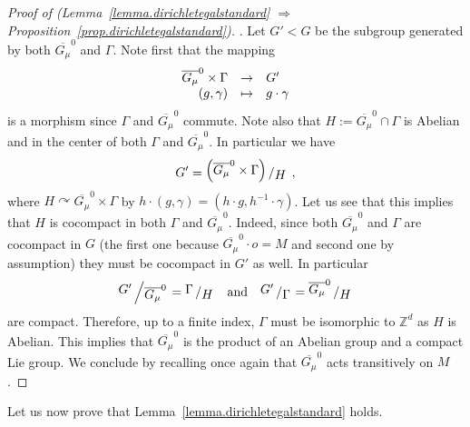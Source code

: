 \documentclass[AHL,Unicode,longabstracts,published]{cedram}
\newcommand{\ZZ}{\mathbb{Z}}
\newcommand{\quotient}[2]{{\raisebox{.2em}{$#1$}\left/\raisebox{-.2em}{$#2$}\right.}}
\newcommand{\fonctionbis}[4]{
\begin{array}{r c l}
#1 & \to & #2 \\
#3 & \mapsto & #4 \\
\end{array}}
\begin{document}
\begin{proof}[Proof of (Lemma~\ref{lemma.dirichletegalstandard} $\Rightarrow$ \emph{Proposition}~\ref{prop.dirichletegalstandard})]. Let $G' < G$ be the subgroup generated by both $\overline{G_{\mu}}^0$ and $\Gamma$. Note first that the mapping
\[
\fonctionbis{\overline{G_{\mu}}^0 \times \Gamma}{G'}{(g, \gamma)}{ g\cdot \gamma }
\]
is a morphism since $\Gamma$ and $\overline{G_{\mu}}^0$ commute. Note also that $H := \overline{G_{\mu}}^0 \cap \Gamma$ is Abelian and in the center of both $\Gamma$ and $\overline{G_{\mu}}^0$. In particular we have
\[
G' = \quotient{\left(\overline{G_{\mu}}^0 \times \Gamma\right)}{H} \ ,
\]
where $H \curvearrowright \overline{G_{\mu}}^0 \times \Gamma$ by $h \cdot (g, \gamma) = (h \cdot g, h^{-1} \cdot \gamma)$. Let us see that this implies that $H$ is cocompact in both $\Gamma$ and $\overline{G_{\mu}}^0$. Indeed, since both $\overline{G_{\mu}}^0$ and $\Gamma$ are cocompact in $G$ (the first one because $\overline{G_{\mu}}^0 \cdot o = M$ and second one by assumption) they must be cocompact in $G'$ as well. In particular
\[
\quotient{G'}{\overline{G_{\mu}}^0} = \quotient{\Gamma}{H} \quad \text{and} \quad \quotient{G'}{\Gamma} = \quotient{\overline{G_{\mu}}^0}{H}
\]
are compact. Therefore, up to a finite index, $\Gamma$ must be isomorphic to $\ZZ^d$ as $H$ is Abelian. This implies that $\overline{G_{\mu}}^0$ is the product of an Abelian group and a compact Lie group. We conclude by recalling once again that $\overline{G_{\mu}}^0$ acts transitively on $M$.
\end{proof}

Let us now prove that Lemma~\ref{lemma.dirichletegalstandard} holds.
\end{document}
